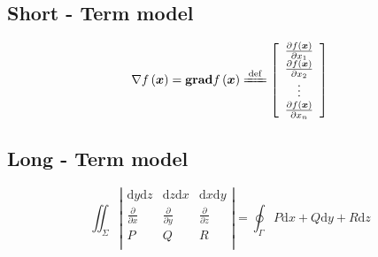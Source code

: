 \documentclass[12pt, a4paper, oneside]{report}
\begin{document}
\subsection{Short - Term model}
\lipsum[4-6]
\begin{equation}
    \nabla f\left( \boldsymbol{x} \right) =\mathbf{grad}f\left( \boldsymbol{x} \right) \xlongequal{\mathrm{def}}\left[ \begin{array}{c}
        \frac{\partial f\left( \boldsymbol{x} \right)}{\partial x_1}\\
        \frac{\partial f\left( \boldsymbol{x} \right)}{\partial x_2}\\
        \vdots\\
        \frac{\partial f\left( \boldsymbol{x} \right)}{\partial x_n}\\
    \end{array} \right] 
\end{equation}


\subsection{Long - Term model}
\lipsum[7-9]
\begin{equation}
    \iint_{\varSigma}{\left| \begin{matrix}
        \mathrm{d}y\mathrm{d}z&		\mathrm{d}z\mathrm{d}x&		\mathrm{d}x\mathrm{d}y\\
        \frac{\partial}{\partial x}&		\frac{\partial}{\partial y}&		\frac{\partial}{\partial z}\\
        P&		Q&		R\\
    \end{matrix} \right|}=\oint_{\varGamma}{P\mathrm{d}x+Q\mathrm{d}y+R\mathrm{d}z}
\end{equation}





\end{document}
